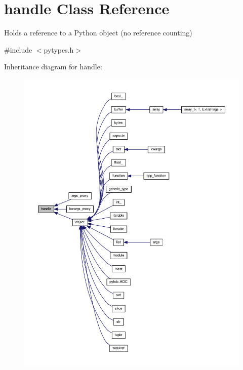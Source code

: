 \hypertarget{classhandle}{}\section{handle Class Reference}
\label{classhandle}


Holds a reference to a Python object (no reference counting)  




{\ttfamily \#include $<$pytypes.\+h$>$}



Inheritance diagram for handle\+:
\nopagebreak
\begin{figure}[H]
\begin{center}
\leavevmode
\includegraphics[width=350pt]{classhandle__inherit__graph}
\end{center}
\end{figure}
